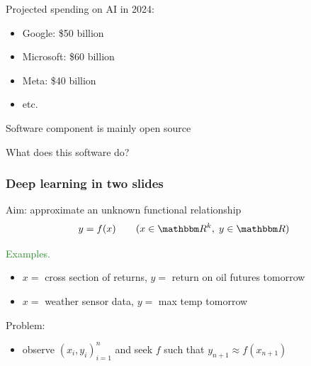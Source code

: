 \documentclass[
    xcolor={svgnames,dvipsnames},
    hyperref={colorlinks, citecolor=DeepPink4, linkcolor=DarkRed, urlcolor=DarkBlue}
    ]{beamer}  %
\newcommand{\Egs}{\textcolor{ForestGreen}{Examples. }}
\newcommand{\1}{\mathbbm 1}
\newcommand{\RR}{\mathbbm R}
\begin{document}
\begin{frame}
    
    Projected spending on AI in 2024:

    \begin{itemize}
        \item Google: \$50 billion
        \vspace{0.5em}
        \item Microsoft: \$60 billion
        \vspace{0.5em}
        \item Meta: \$40 billion
        \vspace{0.5em}
        \item etc.
    \end{itemize}

        \vspace{0.5em}
        \vspace{0.5em}
    Software component is mainly open source
        \vspace{0.5em}
        \vspace{0.5em}

    What does this software do?

\end{frame}





\begin{frame}
    \frametitle{Deep learning in two slides}
    
    Aim: approximate an unknown functional relationship
    \begin{equation*}
        y = f(x)
        \qquad (x \in \RR^k, \; y \in \RR)
    \end{equation*}

    \Egs
    \begin{itemize}
        \item $x = $ cross section of returns, $y = $ return on oil futures tomorrow
        \vspace{0.5em}
        \item $x = $ weather sensor data, $y = $ max temp tomorrow
    \end{itemize}
        \vspace{0.5em}
        \vspace{0.5em}

    Problem:

    \begin{itemize}
        \item observe $(x_i, y_i)_{i=1}^n$ and seek $f$ such that $y_{n+1}
            \approx f(x_{n+1})$
    \end{itemize}


\end{frame}
\end{document}
